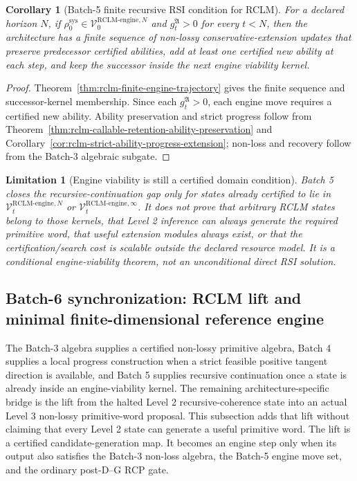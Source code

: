 \documentclass[11pt,a4paper]{article}
\newtheorem{corollary}[theorem]{Corollary}
\newtheorem{limitation}[theorem]{Limitation}
\newcommand{\Vcal}{\mathcal V}
\newcommand{\RCLM}{\mathrm{RCLM}}
\newcommand{\sys}{\mathrm{sys}}
\newcommand{\engine}{\mathrm{engine}}
\begin{document}
\begin{corollary}[Batch-5 finite recursive RSI condition for RCLM]
\label{cor:rclm-batch5-finite-recursive-rsi-condition}
For a declared horizon \(N\), if \(\rho_0^{\sys}\in\Vcal_0^{\RCLM\text{-}\engine,N}\) and \(g_t^{\mathfrak A}>0\) for every \(t<N\), then the architecture has a finite sequence of non-lossy conservative-extension updates that preserve predecessor certified abilities, add at least one certified new ability at each step, and keep the successor inside the next engine viability kernel.
\end{corollary}

\begin{proof}
Theorem~\ref{thm:rclm-finite-engine-trajectory} gives the finite sequence and successor-kernel membership.  Since each \(g_t^{\mathfrak A}>0\), each engine move requires a certified new ability.  Ability preservation and strict progress follow from Theorem~\ref{thm:rclm-callable-retention-ability-preservation} and Corollary~\ref{cor:rclm-strict-ability-progress-extension}; non-loss and recovery follow from the Batch-3 algebraic subgate.
\end{proof}

\begin{limitation}[Engine viability is still a certified domain condition]
\label{lim:rclm-engine-viability-domain-condition}
Batch 5 closes the recursive-continuation gap only for states already certified to lie in \(\Vcal_t^{\RCLM\text{-}\engine,N}\) or \(\Vcal_t^{\RCLM\text{-}\engine,\infty}\).  It does not prove that arbitrary RCLM states belong to those kernels, that Level 2 inference can always generate the required primitive word, that useful extension modules always exist, or that the certification/search cost is scalable outside the declared resource model.  It is a conditional engine-viability theorem, not an unconditional direct RSI solution.
\end{limitation}



\subsection{Batch-6 synchronization: RCLM lift and minimal finite-dimensional reference engine}
\label{subsec:batch6-rclm-lift-reference-engine}

The Batch-3 algebra supplies a certified non-lossy primitive algebra, Batch 4 supplies a local progress construction when a strict feasible positive tangent direction is available, and Batch 5 supplies recursive continuation once a state is already inside an engine-viability kernel.  The remaining architecture-specific bridge is the lift from the halted Level 2 recursive-coherence state into an actual Level 3 non-lossy primitive-word proposal.  This subsection adds that lift without claiming that every Level 2 state can generate a useful primitive word.  The lift is a certified candidate-generation map.  It becomes an engine step only when its output also satisfies the Batch-3 non-loss algebra, the Batch-5 engine move set, and the ordinary post-D--G RCP gate.
\end{document}
